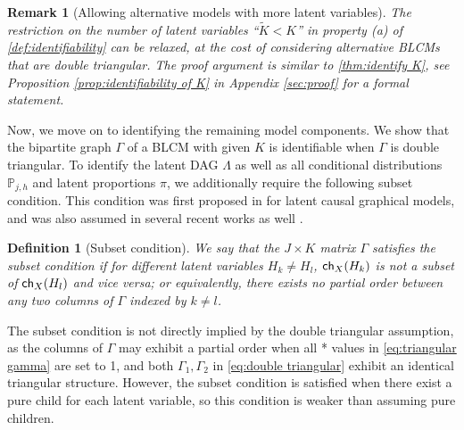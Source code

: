 \documentclass[10pt]{article} %
\newtheorem{definition}{Definition}
\newtheorem{remark}{Remark}
\newcommand{\PP}{\mathbb P}
\newcommand{\ch}{\textsf{\upshape ch}}
\def\tilde{\widetilde}
\begin{document}
\begin{remark}[Allowing alternative models with more latent variables]\label{rmk:alternative K}
    The restriction on the number of latent variables ``$\tilde{K} < K$'' in property (a) of \cref{def:identifiability} can be relaxed, at the cost of considering alternative BLCMs that are double triangular. The proof argument is similar to \cref{thm:identify K}, see Proposition \ref{prop:identifiability of K} in Appendix \ref{sec:proof} for a formal statement.
\end{remark}



Now, we move on to identifying the remaining model components. We show that the bipartite graph $\Gamma$ of a BLCM with given $K$ is identifiable when $\Gamma$ is double triangular. To identify the latent DAG $\Lambda$ as well as all conditional distributions $\PP_{j,h}$ and latent proportions $\pi$, we additionally require the following subset condition. This condition was first proposed in \cite{pearl1992statistical} for latent causal graphical models, and was also assumed in several recent works as well \citep{evans2016graphs, kivva2021learning}.
%

\begin{definition}[Subset condition]\label{def:subset condition}
    We say that the $J \times K$ matrix $\Gamma$ satisfies the subset condition if for different latent variables $H_k \neq H_l$, $\ch_X(H_k)$ is not a subset of $\ch_X(H_l)$ and vice versa; or equivalently, there exists no partial order between any two columns of $\Gamma$ indexed by $k \neq l$.
\end{definition}
The subset condition is not directly implied by the double triangular assumption, as the columns of $\Gamma$ may exhibit a partial order when all * values in \eqref{eq:triangular gamma} are set to 1, and both $\Gamma_1, \Gamma_2$ in \eqref{eq:double triangular} exhibit an identical triangular structure. However, the subset condition is satisfied when there exist a pure child for each latent variable, so this condition is weaker than assuming pure children.
%
\end{document}
